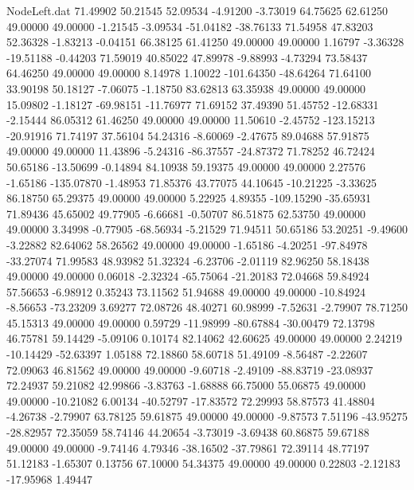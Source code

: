\begin{filecontents}{NodeLeft.dat}
  71.49902   50.21545   52.09534    -4.91200   -3.73019   64.75625   62.61250   49.00000   49.00000   -1.21545   -3.09534  -51.04182  -38.76133
  71.54958   47.83203   52.36328    -1.83213   -0.04151   66.38125   61.41250   49.00000   49.00000    1.16797   -3.36328  -19.51188   -0.44203
  71.59019   40.85022   47.89978    -9.88993   -4.73294   73.58437   64.46250   49.00000   49.00000    8.14978    1.10022 -101.64350  -48.64264
  71.64100   33.90198   50.18127    -7.06075   -1.18750   83.62813   63.35938   49.00000   49.00000   15.09802   -1.18127  -69.98151  -11.76977
  71.69152   37.49390   51.45752   -12.68331   -2.15444   86.05312   61.46250   49.00000   49.00000   11.50610   -2.45752 -123.15213  -20.91916
  71.74197   37.56104   54.24316    -8.60069   -2.47675   89.04688   57.91875   49.00000   49.00000   11.43896   -5.24316  -86.37557  -24.87372
  71.78252   46.72424   50.65186   -13.50699   -0.14894   84.10938   59.19375   49.00000   49.00000    2.27576   -1.65186 -135.07870   -1.48953
  71.85376   43.77075   44.10645   -10.21225   -3.33625   86.18750   65.29375   49.00000   49.00000    5.22925    4.89355 -109.15290  -35.65931
  71.89436   45.65002   49.77905    -6.66681   -0.50707   86.51875   62.53750   49.00000   49.00000    3.34998   -0.77905  -68.56934   -5.21529
  71.94511   50.65186   53.20251    -9.49600   -3.22882   82.64062   58.26562   49.00000   49.00000   -1.65186   -4.20251  -97.84978  -33.27074
  71.99583   48.93982   51.32324    -6.23706   -2.01119   82.96250   58.18438   49.00000   49.00000    0.06018   -2.32324  -65.75064  -21.20183
  72.04668   59.84924   57.56653    -6.98912    0.35243   73.11562   51.94688   49.00000   49.00000  -10.84924   -8.56653  -73.23209    3.69277
  72.08726   48.40271   60.98999    -7.52631   -2.79907   78.71250   45.15313   49.00000   49.00000    0.59729  -11.98999  -80.67884  -30.00479
  72.13798   46.75781   59.14429    -5.09106    0.10174   82.14062   42.60625   49.00000   49.00000    2.24219  -10.14429  -52.63397    1.05188
  72.18860   58.60718   51.49109    -8.56487   -2.22607   72.09063   46.81562   49.00000   49.00000   -9.60718   -2.49109  -88.83719  -23.08937
  72.24937   59.21082   42.99866    -3.83763   -1.68888   66.75000   55.06875   49.00000   49.00000  -10.21082    6.00134  -40.52797  -17.83572
  72.29993   58.87573   41.48804    -4.26738   -2.79907   63.78125   59.61875   49.00000   49.00000   -9.87573    7.51196  -43.95275  -28.82957
  72.35059   58.74146   44.20654    -3.73019   -3.69438   60.86875   59.67188   49.00000   49.00000   -9.74146    4.79346  -38.16502  -37.79861
  72.39114   48.77197   51.12183    -1.65307    0.13756   67.10000   54.34375   49.00000   49.00000    0.22803   -2.12183  -17.95968    1.49447

\end{filecontents}
